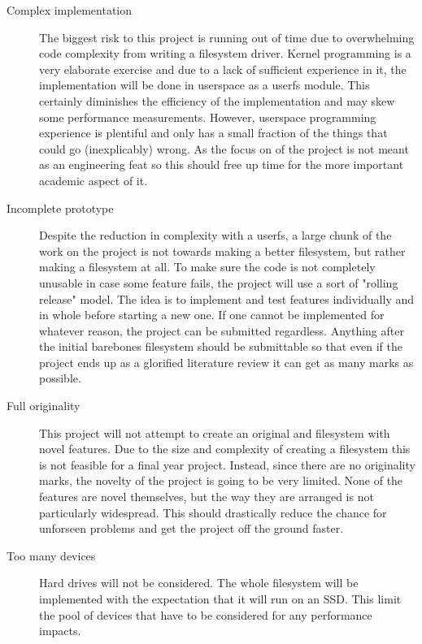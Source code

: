     \begin{description}

        \item[Complex implementation] The biggest risk to this project is
            running out of time due to overwhelming code complexity from
            writing a filesystem driver. Kernel programming is a very elaborate
            exercise and due to a lack of sufficient experience in it, the
            implementation will be done in userspace as a userfs module. This
            certainly diminishes the efficiency of the implementation and may
            skew some performance measurements. However, userspace programming
            experience is plentiful and only has a small fraction of the things
            that could go (inexplicably) wrong. As the focus on of the project
            is not meant as an engineering feat so this should free up time for
            the more important academic aspect of it.

        \item[Incomplete prototype] Despite the reduction in complexity with a
            userfs, a large chunk of the work on the project is not towards
            making a better filesystem, but rather making a filesystem at all.
            To make sure the code is not completely unusable in case some
            feature fails, the project will use a sort of "rolling release"
            model. The idea is to implement and test features individually and
            in whole before starting a new one. If one cannot be implemented
            for whatever reason, the project can be submitted regardless.
            Anything after the initial barebones filesystem should be
            submittable so that even if the project ends up as a glorified
            literature review it can get as many marks as possible.

        \item[Full originality] This project will not attempt to create an
            original and filesystem with novel features. Due to the size and
            complexity of creating a filesystem this is not feasible for a
            final year project. Instead, since there are no originality marks,
            the novelty of the project is going to be very limited. None of the
            features are novel themselves, but the way they are arranged is not
            particularly widespread. This should drastically reduce the chance
            for unforseen problems and get the project off the ground faster.

        \item[Too many devices] Hard drives will not be considered. The whole
            filesystem will be implemented with the expectation that it will
            run on an SSD. This limit the pool of devices that have to be
            considered for any performance impacts.


    \end{description}


